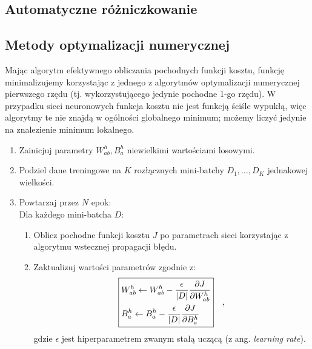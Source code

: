 \documentclass{myclass}
\begin{document}
\subsection{Automatyczne różniczkowanie}

\subsection{Metody optymalizacji numerycznej}

Mając algorytm efektywnego obliczania pochodnych funkcji kosztu, funkcję minimalizujemy korzystając
z jednego z algorytmów optymalizacji numerycznej pierwszego rzędu (tj. wykorzystującego jedynie
pochodne 1-go rzędu). W przypadku sieci neuronowych funkcja kosztu nie jest funkcją ściśle wypukłą,
więc algorytmy te nie znajdą w ogólności globalnego minimum; możemy liczyć jedynie na znalezienie
minimum lokalnego.

\begin{tcolorbox}[title=Algorytm MBGD]
\begin{enumerate}
    \item Zainicjuj parametry \(W^h_{ab}, B_a^h\) niewielkimi wartościami losowymi.

    \item Podziel dane treningowe na \(K\) rozłącznych mini-batchy \(D_1, \ldots, D_K\) jednakowej
    wielkości.
    
    \item Powtarzaj przez \(N\) epok: \\
    Dla każdego mini-batcha \(D\):
    \begin{enumerate}
        \item Oblicz pochodne funkcji kosztu \(J\) po parametrach sieci korzystając z algorytmu
        wstecznej propagacji błędu.

        \item Zaktualizuj wartości parametrów zgodnie z:
        \begin{equation*}
            \boxed{
            \begin{split}
                &W^{h}_{ab} \leftarrow W^{h}_{ab} - \frac{\epsilon}{|D|}\pdv{J}{W_{ab}^h}\\
                &B_a^h \leftarrow B_a^h - \frac{\epsilon}{|D|}\pdv{J}{B_a^h}
            \end{split}}\quad,
        \end{equation*}
        gdzie \(\epsilon\) jest hiperparametrem zwanym stałą uczącą (z ang. \textit{learning rate}).
    \end{enumerate}
\end{enumerate}
\end{tcolorbox}
\end{document}
